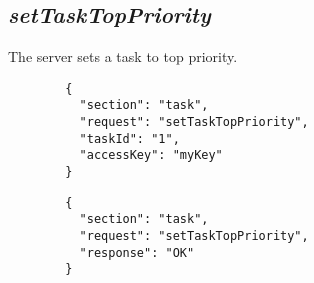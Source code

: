 \subsection*{\textit{setTaskTopPriority}}
	The server sets a task to top priority.
	{
		\color{blue}
		\begin{verbatim}
		{
		  "section": "task",
		  "request": "setTaskTopPriority",
		  "taskId": "1",
		  "accessKey": "myKey"
		}
		\end{verbatim}
	}
	{
		\color{OliveGreen}
		\begin{verbatim}
		{
		  "section": "task",
		  "request": "setTaskTopPriority",
		  "response": "OK"
		}
		\end{verbatim}
	}














